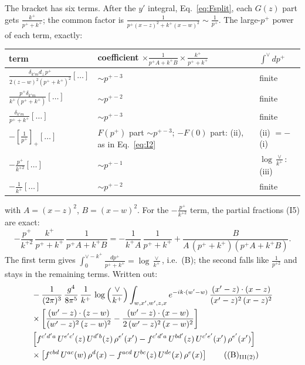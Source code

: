 \documentclass[10pt]{article}
\numberwithin{equation}{section}
\begin{document}
The bracket has six terms. After the $y'$ integral, Eq.~\eqref{eq:Fsplit}, each $G(z)$ part gets $\frac{k^+}{p^++k^+}$; the common factor is $\frac{1}{p^+(x-z)^2+k^+(x-w)^2}\sim\frac{1}{p^+}$. The large-$p^+$ power of each term, exactly:
\begin{center}\renewcommand{\arraystretch}{1.5}
\begin{tabular}{lll}\toprule
term & coefficient $\times\frac{1}{p^+A+k^+B}\times\frac{k^+}{p^++k^+}$ & $\int^{\vee}dp^+$\\\midrule
$\frac{\delta_{k'm}d_\perp p^+}{2(z-w)^2(p^++k^+)^2}[\dots]$ & $\sim p^{+-3}$ & finite\\
$\frac{p^+\delta_{k'm}}{k^+(p^++k^+)}[\dots]$ & $\sim p^{+-2}$ & finite\\
$\frac{\delta_{k'm}}{p^++k^+}[\dots]$ & $\sim p^{+-3}$ & finite\\
$-\left[\frac{1}{p^+}\right]_+[\dots]$ & $F(p^+)$ part $\sim p^{+-3}$; $-F(0)$ part: (ii), as in Eq.~\eqref{eq:I2} & (ii) $=-$(i)\\
$-\frac{p^+}{k^{+2}}[\dots]$ & $\sim p^{+-1}$ & $\log\frac{\vee}{k^+}$: (iii)\\
$-\frac{1}{k^+}[\dots]$ & $\sim p^{+-2}$ & finite\\\bottomrule
\end{tabular}
\end{center}
with $A=(x-z)^2$, $B=(x-w)^2$. For the $-\frac{p^+}{k^{+2}}$ term, the partial fractions (I5) are exact:
\begin{equation}
-\frac{p^+}{k^{+2}}\,\frac{k^+}{p^++k^+}\,\frac{1}{p^+A+k^+B}=-\frac{1}{k^+A}\,\frac{1}{p^++k^+}+\frac{B}{A\,(p^++k^+)(p^+A+k^+B)}.
\label{eq:I5}
\end{equation}
The first term gives $\int_0^{\vee-k^+}\frac{dp^+}{p^++k^+}=\log\frac{\vee}{k^+}$, i.e.\ (B); the second falls like $\frac{1}{p^{+2}}$ and stays in the remaining terms. Written out:
\begin{align}
&-\frac{1}{(2\pi)^{3}}\,\frac{g^{4}}{8\pi^{5}}\,\frac{1}{k^{+}}\,\log{\left(\frac{\vee}{k^{+}}\right)}\int_{w,x',w',z,x} e^{-ik\cdot (w'-w)}\,\frac{(x'-z)\cdot (x-z)}{(x'-z)^{2}\,(x-z)^{2}}\notag \\
& \times\bigg[\frac{(w'-z)\cdot (z-w)}{(w'-z)^{2}\,(z-w)^{2}}-\frac{(w'-z)\cdot (x-w)}{2\,(w'-z)^{2}\,(x-w)^{2}}\bigg]\notag \\
& \left[f^{c'd'a}\,U^{e'c'}(z)\,U^{d'b}(z)\,\rho^{e'}(x')-f^{c'd'a}\, U^{bd'}(z)\,U^{c'e'}(x')\,\rho^{e'}(x')\right]\notag \\
& \times\left[f^{cbd}\,U^{ac}(w)\,\rho^{d}(x) -f^{acd}\,U^{bc}(z)\,U^{de}(x)\,\rho^{e}(x)\right]\tag{(B)$_{\rm III(2)}$}
\end{align}
\end{document}
